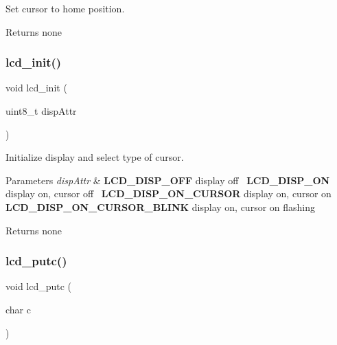Set cursor to home position. 

\begin{DoxyReturn}{Returns}
none 
\end{DoxyReturn}
\mbox{\label{group__pfleury__lcd_ga9af28b2779326b63ff4356e2b1828984}} 
\subsubsection{\texorpdfstring{lcd\+\_\+init()}{lcd\_init()}}
{\footnotesize\ttfamily void lcd\+\_\+init (\begin{DoxyParamCaption}\item[{uint8\+\_\+t}]{disp\+Attr }\end{DoxyParamCaption})}



Initialize display and select type of cursor. 


\begin{DoxyParams}{Parameters}
{\em disp\+Attr} & {\bfseries L\+C\+D\+\_\+\+D\+I\+S\+P\+\_\+\+O\+FF} display off~\newline
 {\bfseries L\+C\+D\+\_\+\+D\+I\+S\+P\+\_\+\+ON} display on, cursor off~\newline
 {\bfseries L\+C\+D\+\_\+\+D\+I\+S\+P\+\_\+\+O\+N\+\_\+\+C\+U\+R\+S\+OR} display on, cursor on~\newline
 {\bfseries L\+C\+D\+\_\+\+D\+I\+S\+P\+\_\+\+O\+N\+\_\+\+C\+U\+R\+S\+O\+R\+\_\+\+B\+L\+I\+NK} display on, cursor on flashing \\
\hline
\end{DoxyParams}
\begin{DoxyReturn}{Returns}
none 
\end{DoxyReturn}
\mbox{\label{group__pfleury__lcd_gafa7e36b95c43d603f510273ad077cbbe}} 
\subsubsection{\texorpdfstring{lcd\+\_\+putc()}{lcd\_putc()}}
{\footnotesize\ttfamily void lcd\+\_\+putc (\begin{DoxyParamCaption}\item[{char}]{c }\end{DoxyParamCaption})}



